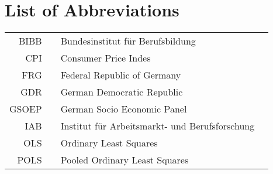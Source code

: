 \section*{List of Abbreviations}

\begin{tabular}{rp{0.2cm}lp{1cm}}
    BIBB    & &  Bundesinstitut für Berufsbildung \\
    CPI     & &  Consumer Price Indes  \\
    FRG     & &  Federal Republic of Germany \\
    GDR    & &  German Democratic Republic \\
    GSOEP & & German Socio Economic Panel\\
    IAB & & Institut für Arbeitsmarkt- und Berufsforschung \\
    OLS & & Ordinary Least Squares\\
    POLS & & Pooled Ordinary Least Squares
\end{tabular}
